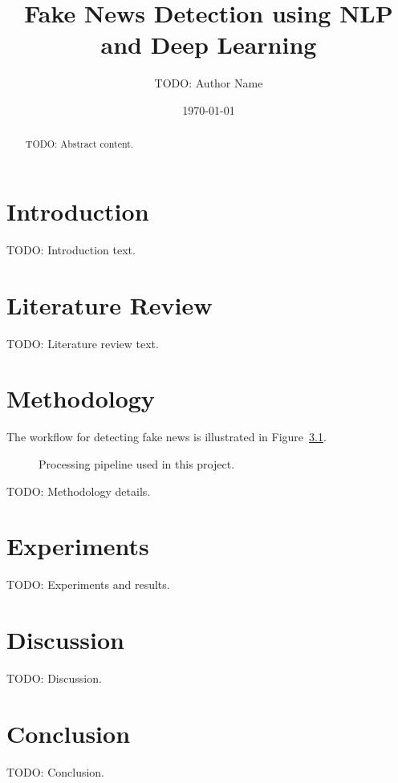 \documentclass{report}
\title{Fake News Detection using NLP and Deep Learning}
\author{TODO: Author Name}
\date{\today}
\begin{document}
\maketitle
\begin{abstract}
TODO: Abstract content.
\end{abstract}
\tableofcontents
\chapter{Introduction}
TODO: Introduction text.
\chapter{Literature Review}
TODO: Literature review text.
\chapter{Methodology}
The workflow for detecting fake news is illustrated in Figure~\ref{fig:pipeline}.

\begin{figure}[h]
    \centering
    \caption{Processing pipeline used in this project.}
    \label{fig:pipeline}
\end{figure}

TODO: Methodology details.
\chapter{Experiments}
TODO: Experiments and results.
\chapter{Discussion}
TODO: Discussion.
\chapter{Conclusion}
TODO: Conclusion.


\end{document}
